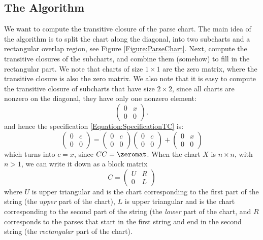 \subsection{The Algorithm} 
We want to compute the transitive closure of the parse chart. The main idea of the algorithm is to split the chart along the diagonal, into two subcharts and a rectangular overlap region, see Figure \ref{Figure:ParseChart}. Next, compute the transitive closures of the subcharts, and combine them (somehow) to fill in the rectangular part. We note that charts of size $1 \times 1$ are the zero matrix, where the transitive closure is also the zero matrix. We also note that it is easy to compute the transitive closure of subcharts that have size $2 \times 2$, since all charts are nonzero on the diagonal, they have only one nonzero element: 
\begin{equation*}
  \begin{pmatrix}
    0 & x \\
    0 & 0
  \end{pmatrix},
\end{equation*}
and hence the specification \eqref{Equation:SpecificationTC} is: 
\begin{equation*}
  \begin{pmatrix}
    0 & c \\
    0 & 0
  \end{pmatrix}
  = 
  \begin{pmatrix}
    0 & c\\
    0 & 0 
  \end{pmatrix}
  \begin{pmatrix}
    0 & c \\
    0 & 0
  \end{pmatrix}
  + 
  \begin{pmatrix}
    0 & x \\
    0 & 0
  \end{pmatrix}
\end{equation*}
which turns into $c = x$, since $CC = \zeromat$.
\label{Section:Subdivision-in-Specification}
When the chart $X$ is $n \times n$, with $n > 1$, we can write it down as a block matrix 
\begin{equation*}
  C = 
  \begin{pmatrix}
    U & R \\
    0 & L
  \end{pmatrix}
\end{equation*}
where $U$ is upper triangular and is the chart corresponding to the first part of the string (the \emph{upper} part of the chart), $L$ is upper triangular and is the chart corresponding to the second part of the string (the \emph{lower} part of the chart, and $R$ corresponds to the parses that start in the first string and end in the second string (the \emph{rectangular} part of the chart).

